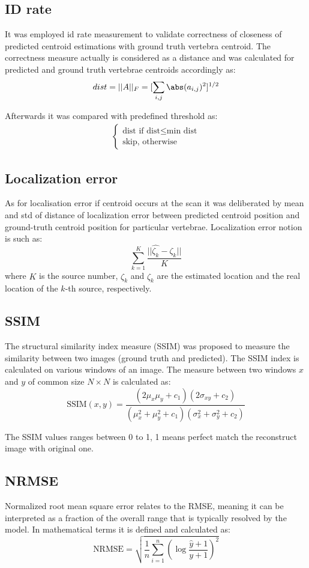 \subsection{ID rate}
It was employed id rate measurement to validate correctness of closeness of predicted centroid estimations with ground truth vertebra centroid. The correctness measure actually is considered as a distance and was calculated for predicted and ground truth vertebrae centroids accordingly as:
\[ dist = ||A||_F = [\sum_{i,j} \abs(a_{i,j})^2]^{1/2} \]

Afterwards it was compared with predefined threshold as:
\begin{align*}
\begin{cases}
\text{dist} \mbox{ if } \text{dist} \leq \text{min dist} \\ 
\text{skip}, \mbox{ otherwise} \end{cases}
\end{align*}

\subsection{Localization error}
As for localisation error if centroid occurs at the scan it was deliberated by mean and std of distance of localization error between predicted centroid position and ground-truth centroid position for particular vertebrae. Localization error notion is such as:
\[ \sum_{k=1}^K \frac{||\hat{\zeta_k} - \zeta_k || }{K} \]
where $K$ is the source number, $\hat{\zeta_k}$ and $\zeta_k$ are the estimated location and the real location of the $k$-th source, respectively.

\subsection{SSIM}
The structural similarity index measure (SSIM) was proposed to measure the similarity between two images (ground truth and predicted). The SSIM index is calculated on various windows of an image. The measure between two windows  $x$ and $y$ of common size $N \times N$ is calculated as: 
\[ \text{SSIM}(x,y) = \frac{(2\mu_x\mu_y + c_1)(2\sigma_{xy}+c_2)}{(\mu_x^2+\mu_y^2+c_1)(\sigma_x^2+\sigma_y^2+c_2)}\]

The SSIM values ranges between 0 to 1, 1 means perfect match the reconstruct image with original one.

\subsection{NRMSE}
Normalized root mean square error relates to the RMSE, meaning it can be interpreted as a fraction of the overall range that is typically resolved by the model. In mathematical terms it is defined and calculated as:
\[ \text{NRMSE} = \sqrt{\frac{1}{n} \sum_{i=1}^n\left(\log \frac{\hat{y}+1}{y+1}\right)^2} \]


